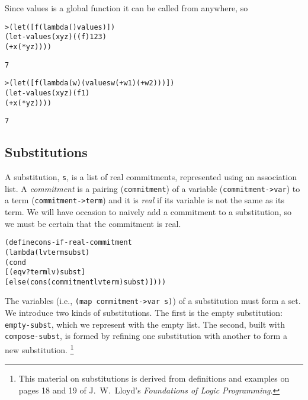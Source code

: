 Since values is a global function it can be called from anywhere, so

\begin{alltt}
> (let ([f (lambda () values)])
    (let-values (x y z) ((f) 1 2 3)
      (+ x (* y z))))

7

> (let ([f (lambda (w) (values w (+ w 1) (+ w 2)))])
    (let-values (x y z) (f 1)
      (+ x (* y z))))

7
\end{alltt}

\subsection{Substitutions}

A substitution, \texttt{s}, is a list of real commitments, represented
using an association list. A \emph{commitment} is a pairing
(\texttt{commitment}) of a variable (\texttt{commitment->var}) to a
term (\texttt{commitment->term}) and it is \emph{real} if its variable
is not the same as its term.  We will have occasion to naively add a
commitment to a substitution, so we must be certain that the
commitment is real.

\begin{alltt}
(define cons-if-real-commitment
  (lambda (lv term subst)
    (cond
      [(eqv? term lv) subst]
      [else (cons (commitment lv term) subst)])))
\end{alltt}

\noindent
The variables (i.e., \texttt{(map commitment->var s)}) of a
substitution must form a set.  We introduce two kinds of
substitutions.  The first is the empty substitution:
\texttt{empty-subst}, which we represent with the empty list.  The
second, built with \texttt{compose-subst}, is formed by refining one
substitution with another to form a new substitution.
\footnote{This material on substitutions is derived from
definitions and examples on pages 18 and 19 of J.\ W.\ Lloyd's
\emph{Foundations of Logic Programming}.}

